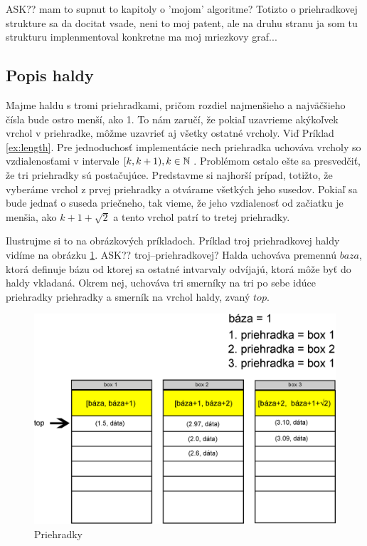 ASK?? mam to supnut to kapitoly o 'mojom' algoritme?
Totizto o priehradkovej strukture sa da docitat vsade, neni
to moj patent, ale na druhu stranu ja som tu strukturu implenmentoval konkretne ma moj mriezkovy graf...


\subsection{Popis haldy}
Majme haldu s tromi priehradkami, pričom rozdiel najmenšieho a najväčšieho čísla bude ostro menší, ako 1. To nám zaručí,
že pokiaľ uzavrieme akýkoľvek vrchol v priehradke, môžme uzavrieť aj všetky ostatné vrcholy. Viď Príklad \ref{ex:length}. Pre jednoduchosť implementácie nech priehradka uchováva vrcholy so vzdialenosťami v intervale
$[k, k+1), k\in \mathbb{N}\,$. 
Problémom ostalo ešte sa presvedčiť, že tri priehradky sú postačujúce. Predstavme si najhorší prípad, totižto, že vyberáme vrchol z prvej priehradky
a otvárame všetkých jeho susedov. Pokiaľ sa bude jednať o suseda priečneho, tak vieme, že jeho vzdialenosť od začiatku je menšia, ako $k+1+\sqrt{2}$
a tento vrchol patrí to tretej priehradky.

Ilustrujme si to na obrázkových príkladoch. Príklad troj priehradkovej haldy vidíme na obrázku \ref{fig:priehradky}.
ASK?? troj--priehradkovej? 
Halda uchováva premennú $ baza $, ktorá definuje bázu od ktorej sa ostatné intvarvaly odvíjajú, ktorá môže byť do haldy vkladaná. Okrem
nej, uchováva tri smerníky na tri po sebe idúce priehradky priehradky a smerník na vrchol haldy, zvaný $ top $.



\begin{figure}[h]
\centering
\includegraphics[width=\textwidth]{./img/priehradky_naplnene_default.eps}
\caption{Priehradky}
\label{fig:priehradky}
\end{figure}

